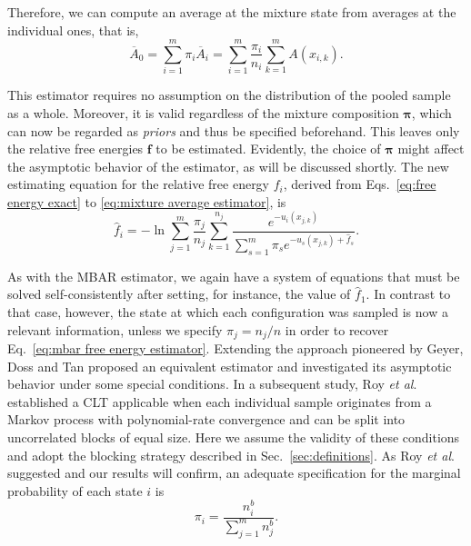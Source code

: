\documentclass[aip,jcp,reprint,amsmath,amssymb]{revtex4-1}
\newcommand{\vt}[1]{\boldsymbol{\mathbf{#1}}}           %
\begin{document}
Therefore, we can compute an average at the mixture state from averages at the individual ones, that is,
\begin{equation}
\label{eq:mixture average estimator}
{\overline A}_0 = \sum_{i=1}^m \pi_i \overline{A}_i = \sum_{i=1}^m \frac{\pi_i}{n_i} \sum_{k=1}^m A(x_{i,k}).
\end{equation}

This estimator requires no assumption on the distribution of the pooled sample as a whole. Moreover, it is valid regardless of the mixture composition $\vt \pi$, which can now be regarded as \textit{priors} and thus be specified beforehand. This leaves only the relative free energies $\vt f$ to be estimated. Evidently, the choice of $\vt \pi$ might affect the asymptotic behavior of the estimator, as will be discussed shortly. The new estimating equation for the relative free energy $f_i$, derived from Eqs.~\eqref{eq:free energy exact} to \eqref{eq:mixture average estimator}, is
\begin{equation}
\label{eq:mblock free energy estimator}
{\hat f}_i = -\ln \sum_{j=1}^m \frac{\pi_j}{n_j} \sum_{k=1}^{n_j} \frac{e^{-u_i(x_{j,k})}}{\sum_{s=1}^m \pi_s e^{-u_s(x_{j,k}) + {\hat f}_s}}.
\end{equation}

As with the MBAR estimator, we again have a system of equations that must be solved self-consistently after setting, for instance, the value of $\hat f_1$. In contrast to that case, however, the state at which each configuration was sampled is now a relevant information, unless we specify $\pi_j = {n_j}/{n}$ in order to recover Eq.~\eqref{eq:mbar free energy estimator}. Extending the approach pioneered by Geyer,\cite{Geyer_1994} Doss and Tan\cite{Doss_2014} proposed an equivalent estimator and investigated its asymptotic behavior under some special conditions. In a subsequent study, Roy \textit{et al}.\cite{Roy_2018} established a CLT applicable when each individual sample originates from a Markov process with polynomial-rate convergence and can be split into uncorrelated blocks of equal size. Here we assume the validity of these conditions and adopt the blocking strategy described in Sec.~\ref{sec:definitions}. As Roy \textit{et al}.\cite{Roy_2018} suggested and our results will confirm, an adequate specification for the marginal probability of each state $i$ is
\begin{equation}
\label{eq:mblock prior}
\pi_i = \frac{n^b_i}{\sum_{j=1}^m n^b_j}.
\end{equation}
\end{document}
